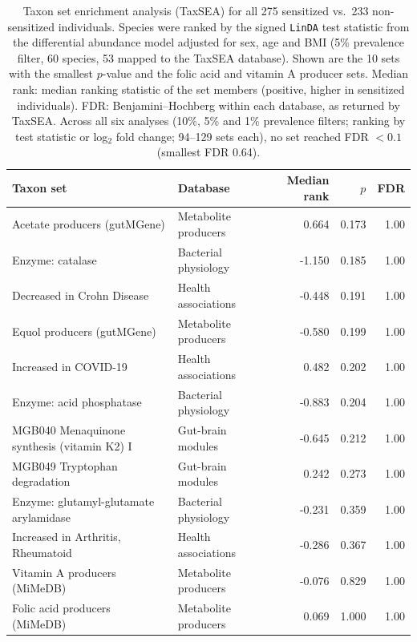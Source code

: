 \begin{table}[h!]
\centering
\footnotesize
\begin{tabular}{l l r r r}
\textbf{Taxon set} & \textbf{Database} & \textbf{Median rank} & \textbf{$p$} & \textbf{FDR} \\
\hline
Acetate producers (gutMGene) & Metabolite producers & 0.664 & 0.173 & 1.00 \\
Enzyme: catalase & Bacterial physiology & -1.150 & 0.185 & 1.00 \\
Decreased in Crohn Disease & Health associations & -0.448 & 0.191 & 1.00 \\
Equol producers (gutMGene) & Metabolite producers & -0.580 & 0.199 & 1.00 \\
Increased in COVID-19 & Health associations & 0.482 & 0.202 & 1.00 \\
Enzyme: acid phosphatase & Bacterial physiology & -0.883 & 0.204 & 1.00 \\
MGB040 Menaquinone synthesis (vitamin K2) I & Gut-brain modules & -0.645 & 0.212 & 1.00 \\
MGB049 Tryptophan degradation & Gut-brain modules & 0.242 & 0.273 & 1.00 \\
Enzyme: glutamyl-glutamate arylamidase & Bacterial physiology & -0.231 & 0.359 & 1.00 \\
Increased in Arthritis, Rheumatoid & Health associations & -0.286 & 0.367 & 1.00 \\
Vitamin A producers (MiMeDB) & Metabolite producers & -0.076 & 0.829 & 1.00 \\
Folic acid producers (MiMeDB) & Metabolite producers & 0.069 & 1.000 & 1.00 \\
\hline
\end{tabular}
\caption{Taxon set enrichment analysis (TaxSEA) for all 275 sensitized vs.\ 233 non-sensitized individuals. Species were ranked by the signed \texttt{LinDA} test statistic from the differential abundance model adjusted for sex, age and BMI (5\% prevalence filter, 60 species, 53 mapped to the TaxSEA database). Shown are the 10 sets with the smallest $p$-value and the folic acid and vitamin A producer sets. Median rank: median ranking statistic of the set members (positive, higher in sensitized individuals). FDR: Benjamini--Hochberg within each database, as returned by TaxSEA. Across all six analyses (10\%, 5\% and 1\% prevalence filters; ranking by test statistic or log$_2$ fold change; 94--129 sets each), no set reached FDR $< 0.1$ (smallest FDR 0.64).\label{tab:taxsea_recomputed}}
\end{table}
